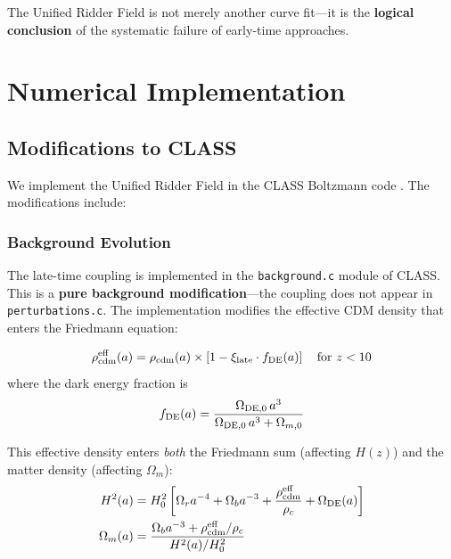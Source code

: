 \documentclass[twocolumn,showpacs,preprintnumbers,amsmath,amssymb,prd]{revtex4-2}
\begin{document}
The Unified Ridder Field is not merely another curve fit---it is the \textbf{logical conclusion} of the systematic failure of early-time approaches.

\section{Numerical Implementation}
\label{sec:numerical}

\subsection{Modifications to CLASS}

We implement the Unified Ridder Field in the CLASS Boltzmann code \cite{CLASS2011}. The modifications include:

\subsubsection{Background Evolution}

The late-time coupling is implemented in the \texttt{background.c} module of CLASS. This is a \textbf{pure background modification}---the coupling does not appear in \texttt{perturbations.c}. The implementation modifies the effective CDM density that enters the Friedmann equation:

\begin{equation}
\rho_{\rm cdm}^{\rm eff}(a) = \rho_{\rm cdm}(a) \times \left[1 - \xi_{\rm late} \cdot f_{\rm DE}(a)\right] \quad \text{for } z < 10
\label{eq:rho_eff}
\end{equation}
where the dark energy fraction is
\begin{equation}
f_{\rm DE}(a) = \frac{\Omega_{\rm DE,0} \, a^3}{\Omega_{\rm DE,0} \, a^3 + \Omega_{m,0}}
\label{eq:fde}
\end{equation}

This effective density enters \textit{both} the Friedmann sum (affecting $H(z)$) and the matter density (affecting $\Omega_m$):
\begin{align}
H^2(a) &= H_0^2 \left[\Omega_r a^{-4} + \Omega_b a^{-3} + \frac{\rho_{\rm cdm}^{\rm eff}}{\rho_c} + \Omega_{\rm DE}(a)\right] \\
\Omega_m(a) &= \frac{\Omega_b a^{-3} + \rho_{\rm cdm}^{\rm eff}/\rho_c}{H^2(a)/H_0^2}
\end{align}
\end{document}
